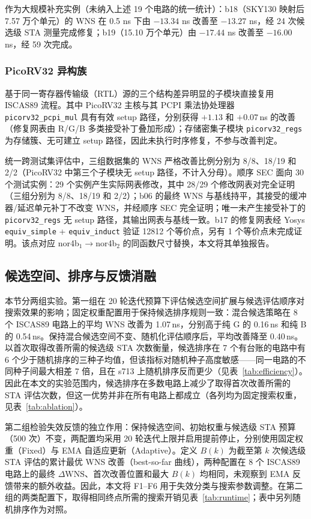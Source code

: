 \documentclass[twocolumn,10pt,fontset=windows]{ctexart}
\begin{document}
作为大规模补充实例（未纳入上述 19 个电路的统一统计）：b18（SKY130 映射后 7.57 万个单元）的 WNS 在 0.5 ns 下由 $-13.34$ ns 改善至 $-13.27$ ns，经 24 次候选级 STA 测量完成修复；b19（15.10 万个单元）由 $-17.44$ ns 改善至 $-16.00$ ns，经 59 次完成。

\subsubsection{PicoRV32 异构族}

基于同一寄存器传输级（RTL）源的三个结构差异明显的子模块直接复用 ISCAS89 流程。其中 PicoRV32 主核与其 PCPI 乘法协处理器 \texttt{picorv32\_pcpi\_mul} 具有有效 setup 路径，分别获得 $+1.13$ 和 $+0.07\,$ns 的改善（修复网表由 R/G/B 多类接受补丁叠加形成）；存储密集子模块 \texttt{picorv32\_regs} 为存储簇、无可建立 setup 路径，因此未执行时序修复，不参与改善判定。

统一跨测试集评估中，三组数据集的 WNS 严格改善比例分别为 8/8、18/19 和 2/2（PicoRV32 中第三个子模块无 setup 路径，不计入分母）。顺序 SEC 面向 30 个测试实例：29 个实例产生实际网表修改，其中 28/29 个修改网表对完全证明（三组分别为 8/8、18/19 和 2/2）；b06 的最终 WNS 与基线持平，其接受的缓冲器/延迟单元补丁不改变 WNS，并经顺序 SEC 完全证明；唯一未产生接受补丁的 \texttt{picorv32\_regs} 无 setup 路径，其输出网表与基线一致。b17 的修复网表经 Yosys \texttt{equiv\_simple} + \texttt{equiv\_induct} 验证 12812 个等价点，另有 1 个等价点未完成证明。该点对应 nor4b$_1\!\to\!$nor4b$_2$ 的同函数尺寸替换，本文将其单独报告。

\subsection{候选空间、排序与反馈消融}\label{sec:ablation}

本节分两组实验。第一组在 20 轮迭代预算下评估候选空间扩展与候选评估顺序对搜索效果的影响；固定权重配置用于保持候选排序规则一致：混合候选策略在 8 个 ISCAS89 电路上的平均 WNS 改善为 1.07\,ns，分别高于纯 G 的 0.16\,ns 和纯 B 的 0.54\,ns。保持混合候选空间不变、随机化评估顺序后，平均改善降至 0.40\,ns。以首次取得改善所需的候选级 STA 次数衡量，候选排序在 7 个有台账的电路中有 6 个少于随机排序的三种子均值，但该指标对随机种子高度敏感——同一电路的不同种子间最大相差 7 倍，且在 s713 上随机排序反而更少（见表~\ref{tab:efficiency}）。因此在本文的实验范围内，候选排序在多数电路上减少了取得首次改善所需的 STA 评估次数，但这一优势并非在所有电路上都成立（各列均为固定搜索权重，见表~\ref{tab:ablation}）。

第二组检验失效反馈的独立作用：保持候选空间、初始权重与候选级 STA 预算（500 次）不变，两配置均采用 20 轮迭代上限并启用提前停止，分别使用固定权重（Fixed）与 EMA 自适应更新（Adaptive）。定义 $B(k)$ 为截至第 $k$ 次候选级 STA 评估的累计最优 WNS 改善（best-so-far 曲线），两种配置在 8 个 ISCAS89 电路上的最终 $\Delta\mathrm{WNS}$、首次改善位置和最大 $B(k)$ 均相同，未观察到 EMA 反馈带来的额外收益。因此，本文将 F1--F6 用于失效分类与搜索参数调整。在第二组的两类配置下，取得相同终点所需的搜索开销见表~\ref{tab:runtime}；表中另列随机排序作为对照。
\end{document}
